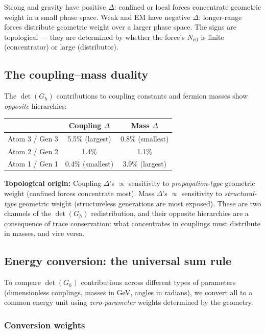 \documentclass[12pt]{article}
\theoremstyle{remark}
\theoremstyle{definition}
\begin{document}
Strong and gravity have positive $\Delta$: confined or local forces concentrate geometric weight in a small phase space. Weak and EM have negative $\Delta$: longer-range forces distribute geometric weight over a larger phase space. The signs are topological --- they are determined by whether the force's $N_\text{eff}$ is finite (concentrator) or large (distributor).

\subsection{The coupling--mass duality}

The $\det(G_h)$ contributions to coupling constants and fermion masses show \emph{opposite} hierarchies:

\begin{center}
\begin{tabular}{lcc}
\hline
& Coupling $\Delta$ & Mass $\Delta$ \\
\hline
Atom 3 / Gen 3 & 5.5\% (largest) & 0.8\% (smallest) \\
Atom 2 / Gen 2 & 1.4\% & 1.1\% \\
Atom 1 / Gen 1 & 0.4\% (smallest) & 3.9\% (largest) \\
\hline
\end{tabular}
\end{center}

\textbf{Topological origin:} Coupling $\Delta$'s $\propto$ sensitivity to \emph{propagation-type} geometric weight (confined forces concentrate most). Mass $\Delta$'s $\propto$ sensitivity to \emph{structural-type} geometric weight (structureless generations are most exposed). These are two channels of the $\det(G_h)$ redistribution, and their opposite hierarchies are a consequence of trace conservation: what concentrates in couplings must distribute in masses, and vice versa.

\subsection{Energy conversion: the universal sum rule}

To compare $\det(G_h)$ contributions across different types of parameters (dimensionless couplings, masses in GeV, angles in radians), we convert all to a common energy unit using \emph{zero-parameter} weights determined by the geometry.

\subsubsection{Conversion weights}
\end{document}
